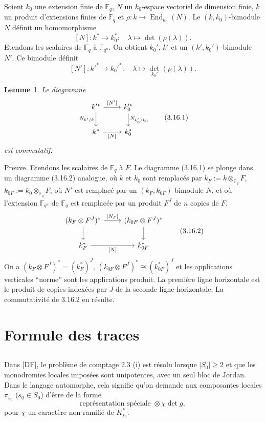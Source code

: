\documentclass[11pt,a4paper]{article}
\theoremstyle{plain}
\newtheorem{lemme}[theorem]{Lemme}
\theoremstyle{definition}
\DeclareMathOperator{\End}{End}
\newcommand{\F}{\mathbb{F}}
\begin{document}
Soient $k_0$ une extension finie de $\F_q$, $N$ un $k_0$-espace vectoriel de dimension finie, $k$ un produit d'extensions finies de $\F_q$ et $\rho: k \to \End_{k_0}(N)$. Le $(k, k_0)$-bimodule $N$ d\'efinit un homomorphisme
\[
[N]: k^* \longrightarrow k_0^*: \quad \lambda \mapsto \det(\rho(\lambda)).
\]
Etendons les scalaires de $\F_q$ \`a $\F_{q^n}$. On obtient $k_0'$, $k'$ et un $(k', k_0')$-bimodule $N'$. Ce bimodule d\'efinit
\[
[N']: k'^* \longrightarrow k_0'^*: \quad \lambda \mapsto \det_{k_0'}(\rho(\lambda)).
\]

\begin{lemme}
Le diagramme
\begin{equation}
\begin{tikzcd}
k'^* \arrow[r, "{[N']}"] \arrow[d, "N_{k'/k}"'] & k_0'^* \arrow[d, "N_{k_0'/k_0}"] \\
k^* \arrow[r, "{[N]}"'] & k_0^*
\end{tikzcd}
\tag{3.16.1}
\end{equation}
est commutatif.
\end{lemme}

Preuve. Etendons les scalaires de $\F_q$ \`a $F$. Le diagramme (3.16.1) se plonge dans un diagramme (3.16.2) analogue, o\`u $k$ et $k_0$ sont remplac\'es par $k_F := k \otimes_{\F_q} F$, $k_{0F} := k_0 \otimes_{\F_q} F$, o\`u $N'$ est remplac\'e par un $(k_F, k_{0F})$-bimodule $N$, et o\`u l'extension $\F_{q^n}$ de $\F_q$ est remplac\'ee par un produit $F^J$ de $n$ copies de $F$.
\[
\begin{tikzcd}
(k_F \otimes F^J)^* \arrow[r, "{[N_F]}"] \arrow[d] & (k_{0F} \otimes F^J)^* \arrow[d] \\
k_F^* \arrow[r, "{[N]}"'] & k_{0F}^*
\end{tikzcd}
\tag{3.16.2}
\]
On a $(k_F \otimes F^J)^* = (k_F^*)^J$, $(k_{0F} \otimes F^J)^* \cong (k_{0F}^*)^J$ et les applications verticales ``norme'' sont les applications produit. La premi\`ere ligne horizontale est le produit de copies index\'ees par $J$ de la seconde ligne horizontale. La commutativit\'e de 3.16.2 en r\'esulte.

\section{Formule des traces}

\subsection{}
Dans [DF], le probl\`eme de comptage 2.3 (i) est r\'esolu lorsque $|S_0| \geq 2$ et que les monodromies locales impos\'ees sont unipotentes, avec un seul bloc de Jordan. Dans le langage automorphe, cela signifie qu'on demande aux composantes locales $\pi_{s_0}$ ($s_0 \in S_0$) d'\^etre de la forme
\begin{equation}
\text{repr\'esentation sp\'eciale } \otimes \chi \det g,
\tag{4.1.1}
\end{equation}
pour $\chi$ un caract\`ere non ramifi\'e de $K_{s_0}^*$.
\end{document}
